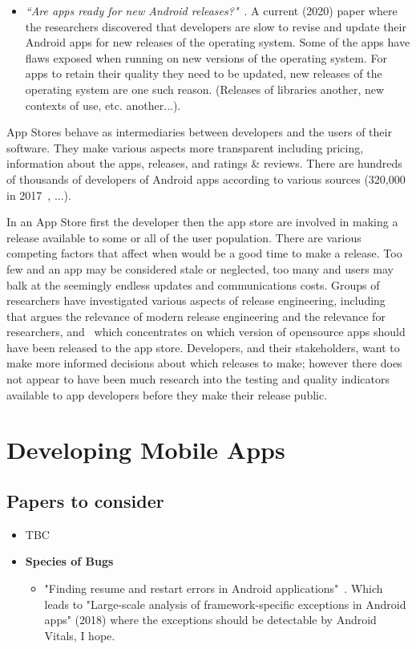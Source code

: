 \begin{itemize}
    \item \emph{``Are apps ready for new Android releases?"}~\cite{guilardi_are_apps_ready_for_new_android_releases}. A current (2020) paper where the researchers discovered that developers are slow to revise and update their Android apps for new releases of the operating system. Some of the apps have flaws exposed when running on new versions of the operating system. For apps to retain their quality they need to be updated, new releases of the operating system are one such reason. (Releases of libraries another, new contexts of use, etc. another...).
    
\end{itemize}


App Stores behave as intermediaries between developers and the users of their software. They make various aspects more transparent including pricing, information about the apps, releases, and ratings \& reviews. There are hundreds of thousands of developers of Android apps according to various sources (320,000 in 2017~\cite{wang2017_exploratory_study_of_the_mobile_app_ecosystem}, ...).


In an App Store first the developer then the app store are involved in making a release available to some or all of the user population. There are various competing factors that affect when would be a good time to make a release. Too few and an app may be considered stale or neglected, too many and users may balk at the seemingly endless updates and communications costs. Groups of researchers have investigated various aspects of release engineering, including~\cite{adams2016modern} that argues the relevance of modern release engineering and the relevance for researchers, and~\cite{nayebi2017version} which concentrates on which version of opensource apps should have been released to the app store. Developers, and their stakeholders, want to make more informed decisions about which releases to make; however there does not appear to have been much research into the testing and quality indicators available to app developers before they make their release public.


\section{Developing Mobile Apps}

\subsection{Papers to consider}
\begin{itemize}
    \item TBC
    \item \textbf{Species of Bugs}
    \begin{itemize}
        \item "Finding resume and restart errors in Android applications"~\cite{shan2016finding}. Which leads to "Large-scale analysis of framework-specific exceptions in Android apps" (2018) where the exceptions should be detectable by Android Vitals, I hope.
    \end{itemize}
\end{itemize}

